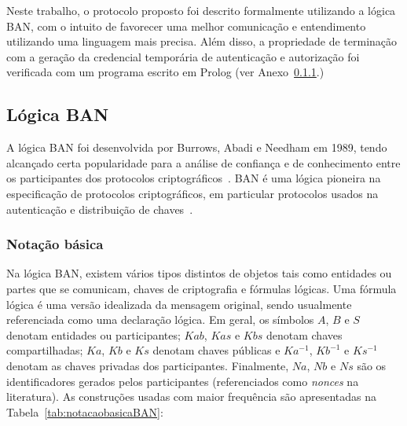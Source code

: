 Neste trabalho, o protocolo proposto foi descrito formalmente utilizando a lógica BAN, 
com o intuito de favorecer uma melhor comunicação e entendimento utilizando uma linguagem mais precisa. 
Além disso, a propriedade de terminação com a geração da credencial temporária de autenticação e autorização 
foi verificada com um programa escrito em Prolog (ver {\color{red}Anexo~\ref{}}.)


\subsection{Lógica BAN}

A lógica BAN foi desenvolvida por Burrows, Abadi e Needham em 1989, tendo alcan\c cado 
certa popularidade para a análise de confian\c ca e de conhecimento entre os participantes 
dos protocolos criptográficos~\cite{Burrows1990}. BAN \'{e} uma l\'{o}gica pioneira na especifica\c c\~{a}o de 
 protocolos criptográficos, em particular protocolos usados na autenticação e 
distribuição de chaves~\cite{Burrows1990}.

\subsubsection{Notação básica}

Na lógica BAN, existem vários tipos distintos de objetos tais como entidades ou partes que se 
comunicam, chaves de criptografia e fórmulas lógicas. Uma fórmula lógica é uma versão idealizada da mensagem original, 
sendo usualmente referenciada como uma declaração lógica. Em geral, os símbolos $A$, $B$ e $S$ denotam 
entidades ou participantes; $Kab$, $Kas$ e $Kbs$ denotam chaves compartilhadas; $Ka$, $Kb$ e $Ks$ 
denotam chaves públicas e $Ka^{-1}$, $Kb^{-1}$ e $Ks^{-1}$ denotam as chaves privadas dos participantes. 
Finalmente, $Na$, $Nb$ e $Ns$ são os identificadores gerados pelos participantes (referenciados como \emph{nonces} 
na literatura). As construções usadas com maior frequ\^{e}ncia 
são apresentadas na Tabela~\ref{tab:notacaobasicaBAN}:

 \newcommand{\RHQuery}{\textbf{[???]}}
\newcommand{\RHRemark}[1]{\textbf{[#1]}}
\newcommand{\Believess}[2]{{#1}\mathrel{\textbf{\mid\equiv}}{#2}}
\newcommand{\Seess}[2]{{#1}\mathrel{\textbf{\triangleleft}}{#2}}
\newcommand{\Saids}[2]{{#1}\mathrel{\textbf{\mid\sim}}{#2}}

\newcommand{\Believes}[2]{{#1}\mathrel{\textbf{acredita}}{#2}}
\newcommand{\Sees}[2]{{#1}\mathrel{\textbf{recebeu}}{#2}}
\newcommand{\Said}[2]{{#1}\mathrel{\textbf{disse}}{#2}}
\newcommand{\Controls}[2]{{#1}\mathrel{\textbf{controla}}{#2}}
\newcommand{\Fresh}[1]{{#1}\,\textbf{novo}}
\newcommand{\Share}[3]{{#1}\stackrel{#2}{\longleftrightarrow}{#3}}
\newcommand{\ShareSecret}[3]{{#1}\stackrel{#2}{\rightleftharpoons}{#3}}
\newcommand{\PubKey}[2]{{}\stackrel{#1}{\mapsto}{#2}}
\newcommand{\Secret}[3]{{#1}\stackrel{#2}{\leftrightharpoons}{#3}}
\newcommand{\Encrypt}[2]{\{\,{#1}\,\}_{#2}}
\newcommand{\EncryptFrom}[3]{\{\,{#1}\,\}_{#2}^{#3}}
\newcommand{\Attach}[2]{\langle {#1}\rangle_{#2}}

